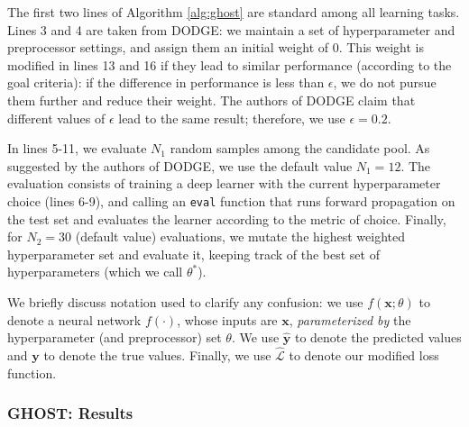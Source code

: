 \documentclass[10pt,compsoc,twocolumn]{IEEEtran}
\begin{document}
The first two lines of  Algorithm \ref{alg:ghost} are standard among all learning tasks.
Lines 3 and 4 are taken from  DODGE: we maintain a set of hyperparameter and preprocessor settings, and assign them an initial weight of 0. This weight is modified in lines 13 and 16 if they lead to similar performance (according to the goal criteria): if the difference in performance is less than $\epsilon$, we do not pursue them further and reduce their weight. The authors of DODGE claim that different values of $\epsilon$ lead to the same result; therefore, we use $\epsilon = 0.2$. 

In lines 5-11, we evaluate $N_1$ random samples among the candidate pool. As suggested by the authors of DODGE, we use the default value $N_1 = 12$. The evaluation consists of training a deep learner with the current hyperparameter choice (lines 6-9), and calling an \texttt{eval} function that  runs forward propagation on the test set and evaluates the learner according to the metric of choice. Finally, for $N_2=30$ (default value) evaluations, we mutate the highest weighted hyperparameter set and evaluate it, keeping track of the best set of hyperparameters (which we call $\theta^*$).

We briefly discuss notation used to clarify any confusion: we use $f(\textbf{x}; \theta)$ to denote a neural network $f(\cdot)$, whose inputs are $\textbf{x}$, \textit{parameterized by} the hyperparameter (and preprocessor) set $\theta$. We use $\hat{\textbf{y}}$ to denote the predicted values and $\textbf{y}$ to denote the true values. Finally, we use $\hat{\mathcal{L}}$ to denote our modified loss function.
\subsubsection{GHOST: Results}


\end{document}
